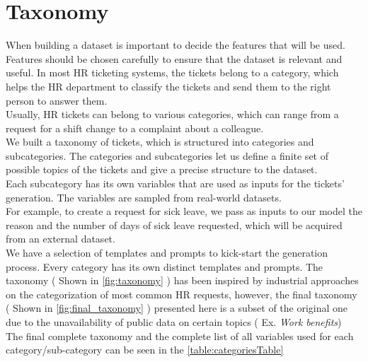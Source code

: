 \section{Taxonomy}
\label{sec:taxonomy}
When building a dataset is important to decide the features that will be used. Features should be chosen carefully to ensure that the dataset is relevant and useful. In most HR ticketing systems, the tickets belong to a category, which helps the HR department to classify the tickets and send them to the right person to answer them. \\
Usually, HR tickets can belong to various categories, which can range from a request for a shift change to a complaint about a colleague. \\
We built a taxonomy of tickets, which is structured into categories and subcategories. The categories and subcategories let us define a finite set of possible topics of the tickets and give a precise structure to the dataset. \\
Each subcategory has its own variables that are used as inputs for the tickets' generation. The variables are sampled from real-world datasets. \\
For example, to create a request for sick leave, we pass as inputs to our model the reason and the number of days of sick leave requested, which will be acquired from an external dataset. \\
We have a selection of templates and prompts to kick-start the generation process. Every category has its own distinct templates and prompts. The taxonomy ( Shown in \autoref{fig:taxonomy} ) has been inspired by industrial approaches on the categorization of most common HR requests, however, the final taxonomy ( Shown in \autoref{fig:final_taxonomy} ) presented here is a subset of the original one due to the unavailability of public data on certain topics ( Ex. \textit{Work benefits}) \\ The final complete taxonomy and the complete list of all variables used for each category/sub-category can be seen in the \autoref{table:categoriesTable}

